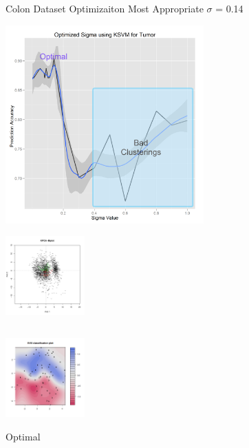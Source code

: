 \documentclass[serif]{beamer}
\begin{document}
	
	\begin{frame}[t]
		{
			\begin{center}
				\begin{exampleblock}{Colon Dataset Optimizaiton}
					Most Appropriate $\sigma$ = 0.14
				\end{exampleblock}
			\end{center}
			\begin{center}
				\includegraphics[width=3.0in]{images/sigma_graphs/sigma_graph_for_Tumor}
			\end{center}
		}
		{
			\begin{center}
				\includegraphics[height=1.2in]{images/ksvm/to_compare}	
			\end{center}
			\vspace{-0.3in}
			\begin{columns}
				\begin{column}{2in}
					\begin{center}
						\includegraphics[height=1.2in]{images/ksvm/optimal}	
					\end{center}
					\vspace{-0.2in}
					\begin{block}{Optimal}

\end{block}
\end{column}
\end{columns}}
\end{frame}
\end{document}
